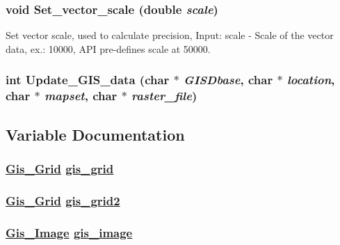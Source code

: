 \hypertarget{GisApi_8C_a31}{
\subsubsection[Set\_\-vector\_\-scale]{\setlength{\rightskip}{0pt plus 5cm}void Set\_\-vector\_\-scale (double {\em scale})}}
\label{GisApi_8C_a31}


Set vector scale, used to calculate precision, Input: scale - Scale of the vector data, ex.: 10000, API pre-defines scale at 50000. 

\hypertarget{GisApi_8C_a33}{
\subsubsection[Update\_\-GIS\_\-data]{\setlength{\rightskip}{0pt plus 5cm}int Update\_\-GIS\_\-data (char $\ast$ {\em GISDbase}, char $\ast$ {\em location}, char $\ast$ {\em mapset}, char $\ast$ {\em raster\_\-file})}}
\label{GisApi_8C_a33}




\subsection{Variable Documentation}
\hypertarget{GisApi_8C_a0}{
\subsubsection[gis\_\-grid]{\setlength{\rightskip}{0pt plus 5cm}\hyperlink{structGis__Grid}{Gis\_\-Grid} \hyperlink{GisApi_8C_a0}{gis\_\-grid}}}
\label{GisApi_8C_a0}


\hypertarget{GisApi_8C_a1}{
\subsubsection[gis\_\-grid2]{\setlength{\rightskip}{0pt plus 5cm}\hyperlink{structGis__Grid}{Gis\_\-Grid} \hyperlink{GisApi_8C_a1}{gis\_\-grid2}}}
\label{GisApi_8C_a1}


\hypertarget{GisApi_8C_a3}{
\subsubsection[gis\_\-image]{\setlength{\rightskip}{0pt plus 5cm}\hyperlink{structGis__Image}{Gis\_\-Image} \hyperlink{GisApi_8C_a3}{gis\_\-image}}}
\label{GisApi_8C_a3}


